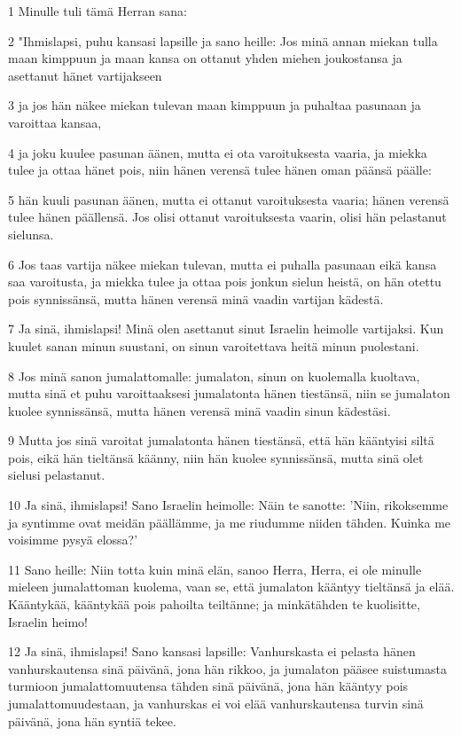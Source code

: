 \par 1 Minulle tuli tämä Herran sana:
\par 2 "Ihmislapsi, puhu kansasi lapsille ja sano heille: Jos minä annan miekan tulla maan kimppuun ja maan kansa on ottanut yhden miehen joukostansa ja asettanut hänet vartijakseen
\par 3 ja jos hän näkee miekan tulevan maan kimppuun ja puhaltaa pasunaan ja varoittaa kansaa,
\par 4 ja joku kuulee pasunan äänen, mutta ei ota varoituksesta vaaria, ja miekka tulee ja ottaa hänet pois, niin hänen verensä tulee hänen oman päänsä päälle:
\par 5 hän kuuli pasunan äänen, mutta ei ottanut varoituksesta vaaria; hänen verensä tulee hänen päällensä. Jos olisi ottanut varoituksesta vaarin, olisi hän pelastanut sielunsa.
\par 6 Jos taas vartija näkee miekan tulevan, mutta ei puhalla pasunaan eikä kansa saa varoitusta, ja miekka tulee ja ottaa pois jonkun sielun heistä, on hän otettu pois synnissänsä, mutta hänen verensä minä vaadin vartijan kädestä.
\par 7 Ja sinä, ihmislapsi! Minä olen asettanut sinut Israelin heimolle vartijaksi. Kun kuulet sanan minun suustani, on sinun varoitettava heitä minun puolestani.
\par 8 Jos minä sanon jumalattomalle: jumalaton, sinun on kuolemalla kuoltava, mutta sinä et puhu varoittaaksesi jumalatonta hänen tiestänsä, niin se jumalaton kuolee synnissänsä, mutta hänen verensä minä vaadin sinun kädestäsi.
\par 9 Mutta jos sinä varoitat jumalatonta hänen tiestänsä, että hän kääntyisi siltä pois, eikä hän tieltänsä käänny, niin hän kuolee synnissänsä, mutta sinä olet sielusi pelastanut.
\par 10 Ja sinä, ihmislapsi! Sano Israelin heimolle: Näin te sanotte: 'Niin, rikoksemme ja syntimme ovat meidän päällämme, ja me riudumme niiden tähden. Kuinka me voisimme pysyä elossa?'
\par 11 Sano heille: Niin totta kuin minä elän, sanoo Herra, Herra, ei ole minulle mieleen jumalattoman kuolema, vaan se, että jumalaton kääntyy tieltänsä ja elää. Kääntykää, kääntykää pois pahoilta teiltänne; ja minkätähden te kuolisitte, Israelin heimo!
\par 12 Ja sinä, ihmislapsi! Sano kansasi lapsille: Vanhurskasta ei pelasta hänen vanhurskautensa sinä päivänä, jona hän rikkoo, ja jumalaton pääsee suistumasta turmioon jumalattomuutensa tähden sinä päivänä, jona hän kääntyy pois jumalattomuudestaan, ja vanhurskas ei voi elää vanhurskautensa turvin sinä päivänä, jona hän syntiä tekee.
